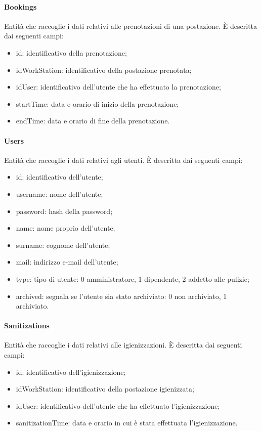 \paragraph{Bookings}
Entità che raccoglie i dati relativi alle prenotazioni di una postazione. È descritta dai seguenti campi:
\begin{itemize}
	\item id: identificativo della prenotazione;
	\item idWorkStation: identificativo della postazione prenotata;
	\item idUser: identificativo dell'utente che ha effettuato la prenotazione;
	\item startTime: data e orario di inizio della prenotazione;
	\item endTime: data e orario di fine della prenotazione. 
\end{itemize}

\paragraph{Users}
Entità che raccoglie i dati relativi agli utenti. È descritta dai seguenti campi:
\begin{itemize}
	\item id: identificativo dell'utente;
	\item username: nome dell'utente;
	\item password: hash della password;
	\item name: nome proprio dell'utente;
	\item surname: cognome dell'utente;
	\item mail: indirizzo e-mail dell'utente;
	\item type: tipo di utente: 0 amministratore, 1 dipendente, 2 addetto alle pulizie;
	\item archived: segnala se l'utente sia stato archiviato: 0 non archiviato, 1 archiviato.
\end{itemize}

\paragraph{Sanitizations}
Entità che raccoglie i dati relativi alle igienizzazioni. È descritta dai seguenti campi:
\begin{itemize}
	\item id: identificativo dell'igienizzazione;
	\item idWorkStation: identificativo della postazione igienizzata;
	\item idUser: identificativo dell'utente che ha effettuato l'igienizzazione;
	\item sanitizationTime: data e orario in cui è stata effettuata l'igienizzazione.
\end{itemize}

